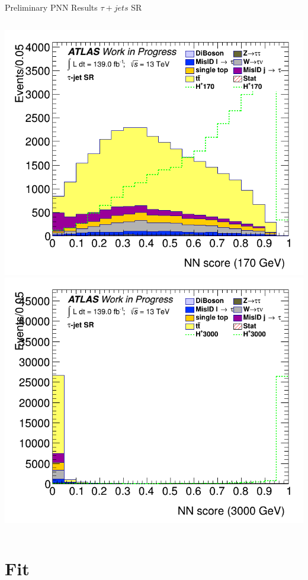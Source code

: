 \documentclass[aspectratio=169,xcolor=table]{beamer}
\begin{document}
\begin{frame}[t]{Preliminary PNN Results $\tau+jets$ SR}
\begin{columns}[t]
        \includegraphics[height=.43\textheight,keepaspectratio=true]{Scores/taujet/rnnTest_1p_3p_noweight/clf_score_GB200_mass_170to170_SR_TAUJET.png}
        \includegraphics[height=.43\textheight,keepaspectratio=true]{Scores/taujet/rnnTest_1p_3p_noweight/clf_score_GB200_mass_3000to3000_SR_TAUJET.png}
      \end{columns}
    \end{frame}

  \section{Fit}
\end{document}

